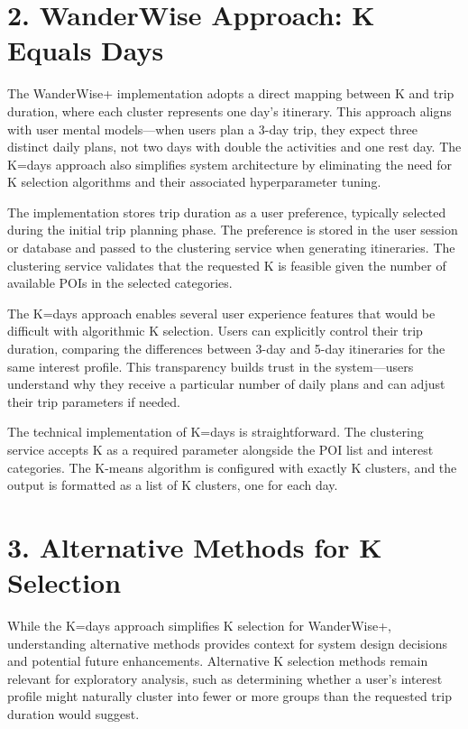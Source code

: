\section{2. WanderWise Approach: K Equals Days}

The WanderWise+ implementation adopts a direct mapping between K and trip duration, where each cluster represents one day's itinerary. This approach aligns with user mental models—when users plan a 3-day trip, they expect three distinct daily plans, not two days with double the activities and one rest day. The K=days approach also simplifies system architecture by eliminating the need for K selection algorithms and their associated hyperparameter tuning.

The implementation stores trip duration as a user preference, typically selected during the initial trip planning phase. The preference is stored in the user session or database and passed to the clustering service when generating itineraries. The clustering service validates that the requested K is feasible given the number of available POIs in the selected categories.

The K=days approach enables several user experience features that would be difficult with algorithmic K selection. Users can explicitly control their trip duration, comparing the differences between 3-day and 5-day itineraries for the same interest profile. This transparency builds trust in the system—users understand why they receive a particular number of daily plans and can adjust their trip parameters if needed.

The technical implementation of K=days is straightforward. The clustering service accepts K as a required parameter alongside the POI list and interest categories. The K-means algorithm is configured with exactly K clusters, and the output is formatted as a list of K clusters, one for each day.

\section{3. Alternative Methods for K Selection}

While the K=days approach simplifies K selection for WanderWise+, understanding alternative methods provides context for system design decisions and potential future enhancements. Alternative K selection methods remain relevant for exploratory analysis, such as determining whether a user's interest profile might naturally cluster into fewer or more groups than the requested trip duration would suggest.

